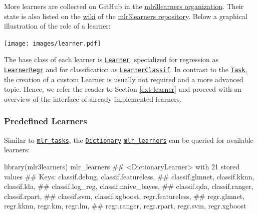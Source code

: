 \documentclass[]{article}
\newenvironment{Shaded}{}{}
\newcommand{\KeywordTok}[1]{\textcolor[rgb]{0.00,0.00,1.00}{#1}}
\newcommand{\NormalTok}[1]{#1}
\renewenvironment{Shaded} {\begin{snugshade}\small} {\end{snugshade}}
\begin{document}
More learners are collected on GitHub in the \href{https://github.com/mlr3learners/}{mlr3learners organization}.
Their state is also listed on the \href{https://github.com/mlr-org/mlr3learners/wiki}{wiki} of the \href{https://github.com/mlr-org/mlr3learners/}{mlr3learners repository}.
Below a graphical illustration of the role of a learner:

\texttt{[image: images/learner.pdf]}

The base class of each learner is \href{https://mlr3.mlr-org.com/reference/Learner.html}{\texttt{Learner}}, specialized for regression as \href{https://mlr3.mlr-org.com/reference/LearnerRegr.html}{\texttt{LearnerRegr}} and for classification as \href{https://mlr3.mlr-org.com/reference/LearnerClassif.html}{\texttt{LearnerClassif}}.
In contrast to the \href{https://mlr3.mlr-org.com/reference/Task.html}{\texttt{Task}}, the creation of a custom Learner is usually not required and a more advanced topic.
Hence, we refer the reader to Section \ref{ext-learner} and proceed with an overview of the interface of already implemented learners.

\hypertarget{learners-predefined}{%
\subsubsection{Predefined Learners}\label{learners-predefined}}

Similar to \href{https://mlr3.mlr-org.com/reference/mlr_tasks.html}{\texttt{mlr\_tasks}}, the \href{https://mlr3misc.mlr-org.com/reference/Dictionary.html}{\texttt{Dictionary}} \href{https://mlr3.mlr-org.com/reference/mlr_learners.html}{\texttt{mlr\_learners}} can be queried for available learners:

\begin{Shaded}
\begin{Highlighting}[]
\KeywordTok{library}\NormalTok{(mlr3learners)}
\NormalTok{mlr_learners}
\NormalTok{## <DictionaryLearner> with 21 stored values}
\NormalTok{## Keys: classif.debug, classif.featureless,}
\NormalTok{##   classif.glmnet, classif.kknn, classif.lda,}
\NormalTok{##   classif.log_reg, classif.naive_bayes,}
\NormalTok{##   classif.qda, classif.ranger, classif.rpart,}
\NormalTok{##   classif.svm, classif.xgboost, regr.featureless,}
\NormalTok{##   regr.glmnet, regr.kknn, regr.km, regr.lm,}
\NormalTok{##   regr.ranger, regr.rpart, regr.svm, regr.xgboost}
\end{Highlighting}
\end{Shaded}
\end{document}
